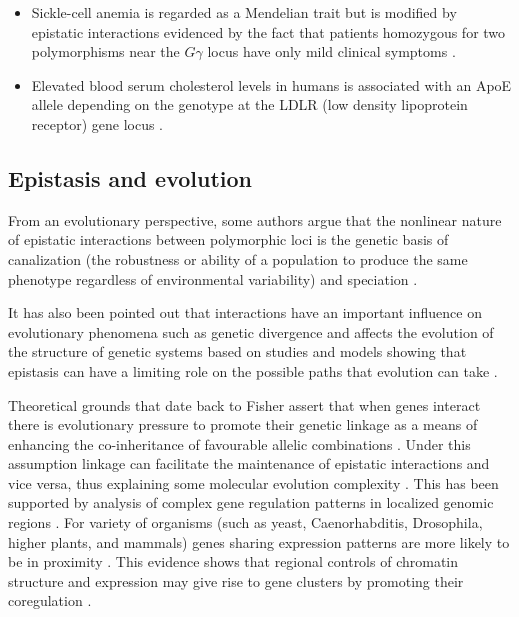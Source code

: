 \begin{itemize}
	\item Sickle-cell anemia is regarded as a Mendelian trait but is modified by epistatic interactions evidenced by the fact that patients homozygous for two polymorphisms near the $G\gamma$ locus have only mild clinical symptoms \cite{odenheimer1983heterogeneity}.

	\item Elevated blood serum cholesterol levels in humans is associated with an ApoE allele depending on the genotype at the LDLR (low density lipoprotein receptor) gene locus \cite{pedersen1989interaction}.

\end{itemize}

\subsection{Epistasis and evolution}

From an evolutionary perspective, some authors argue that the nonlinear nature of epistatic interactions between polymorphic loci is the genetic basis of canalization (the robustness or ability of a population to produce the same phenotype regardless of environmental variability) and speciation \cite{huang2012epistasis}.

It has also been pointed out that interactions have an important influence on evolutionary phenomena such as genetic divergence and affects the evolution of the structure of genetic systems \cite{phillips2008epistasis} based on studies and models showing that epistasis can have a limiting role on the possible paths that evolution can take \cite{miller2006direct}.

Theoretical grounds that date back to Fisher assert that when genes interact there is evolutionary pressure to promote their genetic linkage as a means of enhancing the co-inheritance of favourable allelic combinations \cite{fisher1958genetical}.
Under this assumption linkage can facilitate the maintenance of epistatic interactions and vice versa, thus explaining some molecular evolution complexity \cite{phillips2008epistasis}.
This has been supported by analysis of complex gene regulation patterns in localized genomic regions \cite{birney2007identification}.
For variety of organisms (such as yeast, Caenorhabditis, Drosophila, higher plants, and mammals) genes sharing expression patterns are more likely to be in proximity \cite{hurst2004evolutionary}.
This evidence shows that regional controls of chromatin structure and expression may give rise to gene clusters by promoting their coregulation \cite{petkov2005evidence}.

